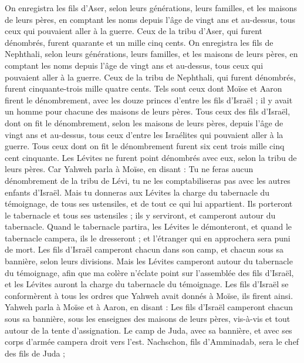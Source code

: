 \begin{multicols}{2}
On enregistra les fils d'Aser, selon leurs générations, leurs familles, et les maisons de leurs pères, en comptant les noms depuis l'âge de vingt ans et au-dessus, tous ceux qui pouvaient aller à la guerre.
Ceux de la tribu d'Aser, qui furent dénombrés, furent quarante et un mille cinq cents.
On enregistra les fils de Nephthali, selon leurs générations, leurs familles, et les maisons de leurs pères, en comptant les noms depuis l'âge de vingt ans et au-dessus, tous ceux qui pouvaient aller à la guerre.
Ceux de la tribu de Nephthali, qui furent dénombrés, furent cinquante-trois mille quatre cents.
Tels sont ceux dont Moïse et Aaron firent le dénombrement, avec les douze princes d'entre les fils d'Israël ; il y avait un homme pour chacune des maisons de leurs pères.
Tous ceux des fils d'Israël, dont on fit le dénombrement, selon les maisons de leurs pères, depuis l'âge de vingt ans et au-dessus, tous ceux d'entre les Israélites qui pouvaient aller à la guerre.
Tous ceux dont on fit le dénombrement furent six cent trois mille cinq cent cinquante.
Les Lévites ne furent point dénombrés avec eux, selon la tribu de leurs pères.
Car Yahweh parla à Moïse, en disant :
Tu ne feras aucun dénombrement de la tribu de Lévi, tu ne les comptabiliseras pas avec les autres enfants d'Israël.
Mais tu donneras aux Lévites la charge du tabernacle du témoignage, de tous ses ustensiles, et de tout ce qui lui appartient. Ils porteront le tabernacle et tous ses ustensiles ; ils y serviront, et camperont autour du tabernacle.
Quand le tabernacle partira, les Lévites le démonteront, et quand le tabernacle campera, ils le dresseront ; et l’étranger qui en approchera sera puni de mort.
Les fils d'Israël camperont chacun dans son camp, et chacun sous sa bannière, selon leurs divisions.
Mais les Lévites camperont autour du tabernacle du témoignage, afin que ma colère n’éclate point sur l'assemblée des fils d'Israël, et les Lévites auront la charge du tabernacle du témoignage.
Les fils d'Israël se conformèrent à tous les ordres que Yahweh avait donnés à Moïse, ils firent ainsi.
\VerseOne{}Yahweh parla à Moïse et à Aaron, en disant :
Les fils d'Israël camperont chacun sous sa bannière, sous les enseignes des maisons de leurs pères, vis-à-vis et tout autour de la tente d'assignation.
Le camp de Juda, avec sa bannière, et avec ses corps d’armée campera droit vers l’est. Nachschon, fils d’Amminadab, sera le chef des fils de Juda ;

\end{multicols}
